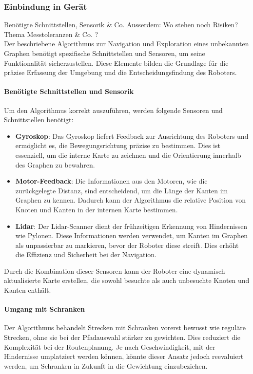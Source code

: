 \documentclass[main.tex]{subfiles} %
\begin{document}
\subsubsection{Einbindung in Gerät}
Benötigte Schnittstellen, Sensorik \& Co. Ausserdem: Wo stehen noch Risiken?
Thema Messtoleranzen \& Co. ?\\

Der beschriebene Algorithmus zur Navigation und Exploration eines
unbekannten Graphen benötigt spezifische Schnittstellen und Sensoren,
um seine Funktionalität sicherzustellen. Diese Elemente bilden die
Grundlage für die präzise Erfassung der Umgebung und die
Entscheidungsfindung des Roboters.

\paragraph{Benötigte Schnittstellen und Sensorik}
Um den Algorithmus korrekt auszuführen, werden folgende Sensoren und
Schnittstellen benötigt:

\begin{itemize}
  \item \textbf{Gyroskop}:
    Das Gyroskop liefert Feedback zur Ausrichtung des Roboters und
    ermöglicht es, die Bewegungsrichtung präzise zu bestimmen. Dies
    ist essenziell, um die interne Karte zu zeichnen und die
    Orientierung innerhalb des Graphen zu bewahren.

  \item \textbf{Motor-Feedback}:
    Die Informationen aus den Motoren, wie die zurückgelegte Distanz,
    sind entscheidend, um die Länge der Kanten im Graphen zu kennen.
    Dadurch kann der Algorithmus die relative Position von Knoten und
    Kanten in der internen Karte bestimmen.

  \item \textbf{Lidar}:
    Der Lidar-Scanner dient der frühzeitigen Erkennung von
    Hindernissen wie Pylonen. Diese Informationen werden verwendet,
    um Kanten im Graphen als unpassierbar zu markieren, bevor der
    Roboter diese streift. Dies erhöht die Effizienz und Sicherheit
    bei der Navigation.

\end{itemize}

Durch die Kombination dieser Sensoren kann der Roboter eine dynamisch
aktualisierte Karte erstellen, die sowohl besuchte als auch
unbesuchte Knoten und Kanten enthält.

\paragraph{Umgang mit Schranken}
Der Algorithmus behandelt Strecken mit Schranken vorerst bewusst wie
reguläre Strecken, ohne sie bei der Pfadauswahl stärker zu gewichten.
Dies reduziert die Komplexität bei der Routenplanung. Je nach
Geschwindigkeit, mit der Hindernisse umplatziert werden können,
könnte dieser Ansatz jedoch reevaluiert werden, um Schranken in
Zukunft in die Gewichtung einzubeziehen.
\end{document}

